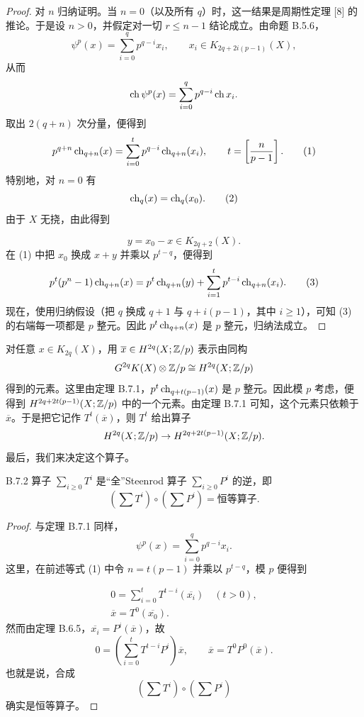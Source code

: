 \begin{proof}
  对 $n$ 归纳证明。当 $n=0$（以及所有 $q$）时，这一结果是周期性定理 [8] 的推论。于是设 $n>0$，并假定对一切 $r\le n-1$ 结论成立。由命题 B.5.6，
  \[
    \psi^p(x)=\sum_{i=0}^{q}p^{q-i}x_i,\qquad x_i\in K_{2q+2i(p-1)}(X),
  \]
  从而
  \[
    \operatorname{ch}\psi^p(x)=\sum_{i=0}^{q}p^{q-i}\operatorname{ch} x_i.
  \]
  取出 $2(q+n)$ 次分量，便得到
  \begin{equation}
    p^{q+n}\operatorname{ch}_{q+n}(x)=\sum_{i=0}^{t}p^{q-i}\operatorname{ch}_{q+n}(x_i),\qquad t=\left[\frac{n}{p-1}\right]. \tag{1}
  \end{equation}
  特别地，对 $n=0$ 有
  \begin{equation}
    \operatorname{ch}_q(x)=\operatorname{ch}_q(x_0). \tag{2}
  \end{equation}
  由于 $X$ 无挠，由此得到

  \[
    y=x_0-x\in K_{2q+2}(X).
  \]
  在 (1) 中把 $x_0$ 换成 $x+y$ 并乘以 $p^{t-q}$，便得到
  \begin{equation}
    p^t(p^n-1)\operatorname{ch}_{q+n}(x)=p^t\operatorname{ch}_{q+n}(y)+\sum_{i=1}^{t}p^{t-i}\operatorname{ch}_{q+n}(x_i). \tag{3}
  \end{equation}
  现在，使用归纳假设（把 $q$ 换成 $q+1$ 与 $q+i(p-1)$，其中 $i\ge1$），可知 (3) 的右端每一项都是 $p$ 整元。因此 $p^t\operatorname{ch}_{q+n}(x)$ 是 $p$ 整元，归纳法成立。
\end{proof}


对任意 $x\in K_{2q}(X)$，用 $\overline{x}\in H^{2q}(X;\mathbb{Z}/p)$ 表示由同构
\[
  G^{2q}K(X)\otimes\mathbb{Z}/p\cong H^{2q}(X;\mathbb{Z}/p)
\]
得到的元素。这里由定理 B.7.1，$p^t\operatorname{ch}_{q+t(p-1)}(x)$ 是 $p$ 整元。因此模 $p$ 考虑，便得到 $H^{2q+2t(p-1)}(X;\mathbb{Z}/p)$ 中的一个元素。由定理 B.7.1 可知，这个元素只依赖于 $\overline{x}$。于是把它记作 $T^t(\overline{x})$，则 $T^t$ 给出算子
\[
  H^{2q}(X;\mathbb{Z}/p)\to H^{2q+2t(p-1)}(X;\mathbb{Z}/p).
\]
最后，我们来决定这个算子。

\begin{theorem*}{B.7.2}
  算子 $\sum_{i\ge0}T^i$ 是“全”Steenrod 算子 $\sum_{i\ge0}P^i$ 的逆，即
  \[
    \left(\sum T^i\right)\circ\left(\sum P^i\right)=\text{恒等算子}.
  \]
\end{theorem*}

\begin{proof}
  与定理 B.7.1 同样，
  \[
    \psi^p(x)=\sum_{i=0}^{q}p^{q-i}x_i.
  \]
  这里，在前述等式 (1) 中令 $n=t(p-1)$ 并乘以 $p^{t-q}$，模 $p$ 便得到

  \begin{gather*}
    0=\sum_{i=0}^{t}T^{t-i}(\overline{x_i})\quad(t>0),\\
    \overline{x}=T^0(\overline{x_0}).
  \end{gather*}
  然而由定理 B.6.5，$\overline{x_i}=P^i(\overline{x})$，故
  \[
    0=\left(\sum_{i=0}^{t}T^{t-i}P^i\right)\overline{x},\qquad \overline{x}=T^0P^0(\overline{x}).
  \]
  也就是说，合成
  \[
    \left(\sum T^i\right)\circ\left(\sum P^i\right)
  \]
  确实是恒等算子。
\end{proof}

